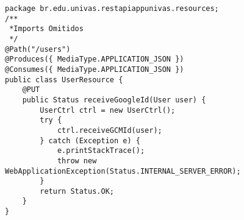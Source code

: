 \begin{lstlisting}[style=custom_JAVA]
package br.edu.univas.restapiappunivas.resources;
/**
 *Imports Omitidos
 */
@Path("/users")
@Produces({ MediaType.APPLICATION_JSON })
@Consumes({ MediaType.APPLICATION_JSON })
public class UserResource {
	@PUT
	public Status receiveGoogleId(User user) {
		UserCtrl ctrl = new UserCtrl();
		try {
			ctrl.receiveGCMId(user);
		} catch (Exception e) {
			e.printStackTrace();
			throw new WebApplicationException(Status.INTERNAL_SERVER_ERROR);
		}
		return Status.OK;
	}
}
\end{lstlisting}